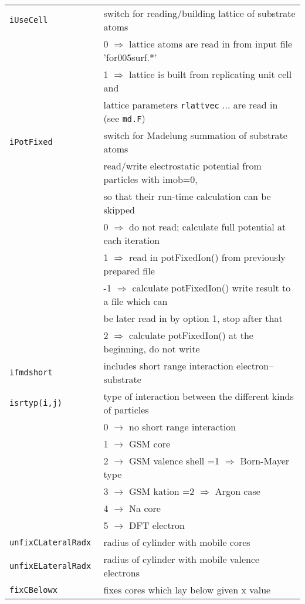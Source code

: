 \documentclass[12pt]{article}
\begin{document}
\begin{tabular}{ll}
{\tt iUseCell         }& switch for reading/building lattice of
                          substrate atoms\\
   & 0 $\Longrightarrow$ lattice atoms are read in from input file 'for005surf.*'\\
   & 1 $\Longrightarrow$ lattice is built from replicating unit cell and\\
   &\qquad lattice parameters {\tt rlattvec} ... are
                          read in (see {\tt md.F})\\
{\tt iPotFixed        }& switch for Madelung summation of substrate atoms\\
   & read/write electrostatic potential from particles with imob=0,\\
   &  so that their run-time calculation can be skipped\\
   &   0 $\Longrightarrow$ do not read; calculate full potential at each iteration\\
   &   1 $\Longrightarrow$ read in potFixedIon() from previously prepared file\\
   &  -1 $\Longrightarrow$ calculate potFixedIon() write result to a file which can\\
   &\qquad  be later read in by option 1, stop after that\\
   &   2 $\Longrightarrow$ calculate potFixedIon() at the beginning, do not write\\
{\tt ifmdshort} & includes short range interaction electron--substrate\\
{\tt isrtyp(i,j)      }& type of interaction between the different kinds of particles\\
{\tt                  }& 0   $\rightarrow$ no short range interaction\\
{\tt                  }& 1   $\rightarrow$ GSM core\\
{\tt                  }& 2   $\rightarrow$ GSM valence shell    =1 $\Longrightarrow$ Born-Mayer type\\
{\tt                  }& 3   $\rightarrow$ GSM kation                   =2 $\Longrightarrow$ Argon case\\
{\tt                  }& 4   $\rightarrow$ Na core\\
{\tt                  }& 5   $\rightarrow$ DFT electron\\
{\tt unfixCLateralRadx  }& radius of cylinder with mobile cores \\
{\tt unfixELateralRadx  }& radius of cylinder with mobile valence electrons\\
{\tt fixCBelowx       }&   fixes cores which lay below given x value\\
\hline
\end{tabular}
\end{document}
